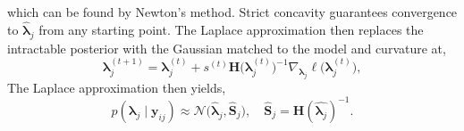 which can be found by Newton's method.
Strict concavity guarantees convergence to $\hat{\bm{\lambda}}_{j}$ from any starting point. The Laplace approximation then replaces the intractable posterior with the Gaussian matched to the model and curvature at,
\begin{equation}
    \bm{\lambda}_{j}^{(t+1)}=
    \bm{\lambda}_{j}^{(t)}
    +s^{(t)}\mathbf{H}\bigl(\bm{\lambda}_{j}^{(t)}
    \bigr)^{-1}\nabla_{\bm{\lambda}_{j}}
    \ell \bigl(\bm{\lambda}_{j}^{(t)}\bigr),
    \label{eq:newton-method}
\end{equation}
The Laplace approximation then yields,
\begin{equation}
    p(\bm{\lambda}_{j}\mid \bm{y}_{ij}) \approx \mathcal{N}\bigl(\hat{\bm{\lambda}}_{j}, \hat{\mathbf{S}}_{j}\bigr), \quad \hat{\mathbf{S}}_{j}=\mathbf{H}(\hat{\bm{\lambda}_{j}})^{-1}.
    \label{eq:surrogate-eq}
\end{equation}
